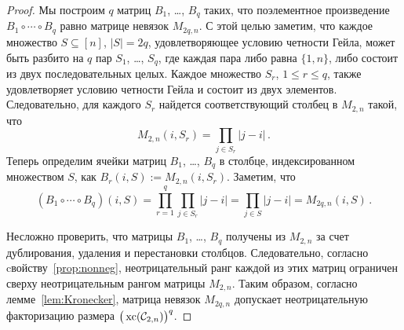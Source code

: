 \begin{proof}
Мы построим $q$ матриц $B_1$, \dots, $B_q$ таких, что поэлементное произведение $B_1 \circ \cdots \circ B_q$ равно матрице невязок $M_{2q, n}$. 
С этой целью заметим, что каждое множество $S\subseteq[n]$, $|S|=2q$, удовлетворяющее условию четности Гейла, может быть разбито на $q$ пар $S_1$, \dots, $S_q$, где каждая пара либо равна $\{1,n\}$, либо состоит из двух последовательных целых. 
Каждое множество $S_r$, $1\le r\le q$, также удовлетворяет условию четности Гейла и состоит из двух элементов. 
Следовательно, для каждого $S_r$ найдется соответствующий столбец в $M_{2, n}$ такой, что
\[
	M_{2,n}(i,S_r)=\prod_{j\in S_r} |j-i|\,.
\]
Теперь определим ячейки матриц $B_1$, \dots, $B_q$ в столбце, индексированном множеством $S$, как $B_r(i,S):=M_{2,n}(i,S_r)$. 
Заметим, что
\[
(B_1 \circ \cdots \circ B_q)(i,S) = \prod_{r = 1}^q \prod_{j \in S_r} |j-i| = \prod_{j \in S} |j-i| = M_{2q,n}(i,S)\,.
\]
	
Несложно проверить, что матрицы $B_1$, \dots, $B_q$ получены из $M_{2,n}$ за счет дублирования, удаления и перестановки столбцов. 
Следовательно, согласно cвойству~\ref{prop:nonneg}, неотрицательный ранг каждой из этих матриц ограничен сверху неотрицательным рангом матрицы $M_{2,n}$. 
Таким образом, согласно лемме~\ref{lem:Kronecker}, матрица невязок $M_{2q, n}$ допускает неотрицательную факторизацию размера $\big(\operatorname{xc}({\mathcal C}_{2,n})\big)^q$.
\end{proof}



